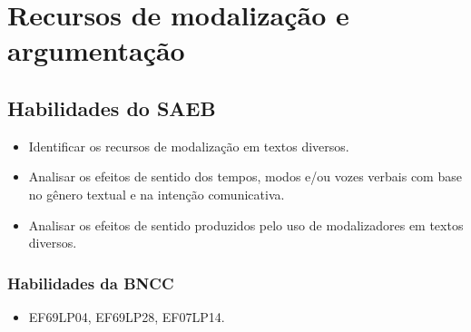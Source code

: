 \chapter{Recursos de modalização e argumentação}

\vspace*{-.5cm}
\enlargethispage{2\baselineskip}

\section*{Habilidades do SAEB}

\begin{itemize}

  \item Identificar os recursos de modalização em textos diversos.

  \item Analisar os efeitos de sentido dos tempos, modos e/ou vozes 
verbais com base no gênero textual e na intenção comunicativa.

  \item Analisar os efeitos de sentido produzidos pelo uso de modalizadores em textos diversos.

\end{itemize}

\subsection{Habilidades da BNCC}

\begin{itemize}

  \item EF69LP04, EF69LP28, EF07LP14.

\end{itemize}

